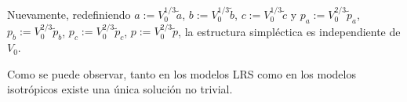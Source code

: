 Nuevamente, redefiniendo $a := V_{0}^{1/3} \tilde{a}$, $b := V_{0}^{1/3} \tilde{b}$, $c := V_{0}^{1/3} \tilde{c}$ y $p_{a} := V_{0}^{2/3} \tilde{p}_{a}$, $p_{b} := V_{0}^{2/3} \tilde{p}_{b}$, $p_{c} := V_{0}^{2/3} \tilde{p}_{c}$, $p := V_{0}^{2/3} \tilde{p}$, la estructura simpl\'{e}ctica es independiente de $V_{0}$.

Como se puede observar, tanto en los modelos LRS como en los modelos isotr\'{o}picos existe una \'{u}nica soluci\'{o}n no trivial.